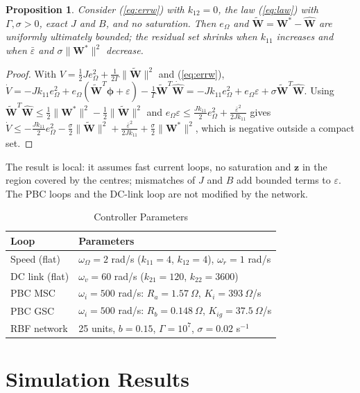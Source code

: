 \documentclass[conference]{IEEEtran}
\newtheorem{proposition}{Proposition}
\newcommand{\bv}[1]{\mathbf{#1}}
\begin{document}
\begin{proposition}
Consider (\ref{eq:errw}) with $k_{12}=0$, the law (\ref{eq:law}) with $\Gamma,\sigma>0$, exact $J$ and
$B$, and no saturation. Then $e_\Omega$ and $\tilde{\bv{W}}=\bv{W}^*-\hat{\bv{W}}$ are uniformly
ultimately bounded; the residual set shrinks when $k_{11}$ increases and when $\bar\varepsilon$ and
$\sigma\|\bv{W}^*\|^2$ decrease.
\end{proposition}
\begin{proof}
With $V=\frac12Je_\Omega^2+\frac{1}{2\Gamma}\|\tilde{\bv{W}}\|^2$ and (\ref{eq:errw}),
$\dot V=-Jk_{11}e_\Omega^2+e_\Omega(\tilde{\bv{W}}^T\boldsymbol\phi+\varepsilon)
-\frac1\Gamma\tilde{\bv{W}}^T\dot{\hat{\bv{W}}}=-Jk_{11}e_\Omega^2+e_\Omega\varepsilon
+\sigma\tilde{\bv{W}}^T\hat{\bv{W}}$. Using
$\tilde{\bv{W}}^T\hat{\bv{W}}\le\frac12\|\bv{W}^*\|^2-\frac12\|\tilde{\bv{W}}\|^2$ and
$e_\Omega\varepsilon\le\frac{Jk_{11}}{2}e_\Omega^2+\frac{\bar\varepsilon^2}{2Jk_{11}}$ gives
$\dot V\le-\frac{Jk_{11}}{2}e_\Omega^2-\frac\sigma2\|\tilde{\bv{W}}\|^2
+\frac{\bar\varepsilon^2}{2Jk_{11}}+\frac\sigma2\|\bv{W}^*\|^2$, which is negative outside a compact set.
\end{proof}
The result is local: it assumes fast current loops, no saturation and $\bv{z}$ in the region covered by
the centres; mismatches of $J$ and $B$ add bounded terms to $\varepsilon$. The PBC loops and the DC-link
loop are not modified by the network.

\begin{table}[t]
\caption{Controller Parameters}
\label{tab:ctrl}
\centering
\footnotesize
\begin{tabular}{ll}
\toprule
Loop & Parameters\\
\midrule
Speed (flat) & $\omega_\Omega=2$ rad/s ($k_{11}=4$, $k_{12}=4$), $\omega_r=1$ rad/s\\
DC link (flat) & $\omega_v=60$ rad/s ($k_{21}=120$, $k_{22}=3600$)\\
PBC MSC & $\omega_i=500$ rad/s: $R_a=1.57~\Omega$, $K_i=393~\Omega$/s\\
PBC GSC & $\omega_i=500$ rad/s: $R_b=0.148~\Omega$, $K_{ig}=37.5~\Omega$/s\\
RBF network & 25 units, $b=0.15$, $\Gamma=10^7$, $\sigma=0.02$ s$^{-1}$\\
\bottomrule
\end{tabular}
\end{table}

\section{Simulation Results}
\end{document}
